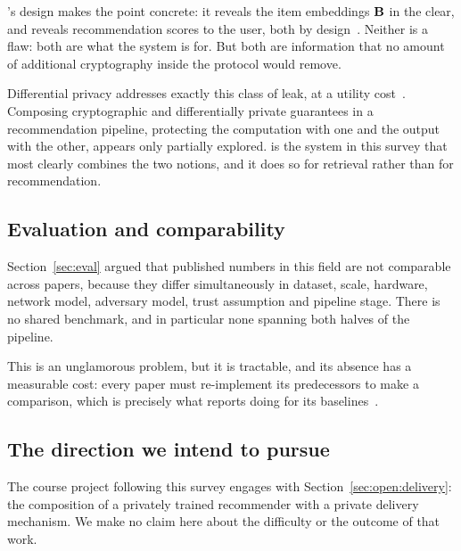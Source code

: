 \nudgeplain{}'s design makes the point concrete: it reveals the item embeddings $\mathbf{B}$ in
the clear, and reveals recommendation scores to the user, both by design~\cite{nudge2026}. Neither
is a flaw: both are what the system is for. But both are information that no amount of
additional cryptography inside the protocol would remove.

Differential privacy addresses exactly this class of leak, at a utility
cost~\cite{dwork2014,mcsherry2009}. Composing cryptographic and differentially private guarantees
in a recommendation pipeline, protecting the computation with one and the output with the other,
appears only partially explored. \wally{} is the system in this survey that most clearly
combines the two notions, and it does so for retrieval rather than for recommendation.

\subsection{Evaluation and comparability}
\label{sec:open:evaluation}

Section~\ref{sec:eval} argued that published numbers in this field are not comparable across
papers, because they differ simultaneously in dataset, scale, hardware, network model, adversary
model, trust assumption and pipeline stage. There is no shared benchmark, and in particular none
spanning both halves of the pipeline.

This is an unglamorous problem, but it is tractable, and its absence has a measurable cost: every
paper must re-implement its predecessors to make a comparison, which is precisely what
\nudgeplain{} reports doing for its baselines~\cite{nudge2026}.

\subsection{The direction we intend to pursue}
\label{sec:open:ours}

The course project following this survey engages with Section~\ref{sec:open:delivery}: the
composition of a privately trained recommender with a private delivery mechanism. We make no claim
here about the difficulty or the outcome of that work.
